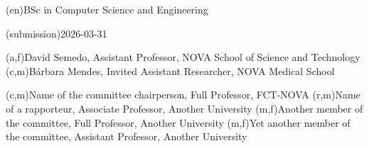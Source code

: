 \ntauthordegree(en){BSc in Computer Science and Engineering}%



\ntdate(submission){2026-03-31}



(a,f){David Semedo, Assistant Professor, NOVA School of Science and Technology}
(c,m){Bárbara Mendes, Invited Assistant Researcher, NOVA Medical School}



(c,m){Name of the committee chairperson, Full Professor, FCT-NOVA}
(r,m){Name of a rapporteur, Associate Professor, Another University}
(m,f){Another member of the committee, Full Professor, Another University}
(m,f){Yet another member of the committee, Assistant Professor, Another University}
